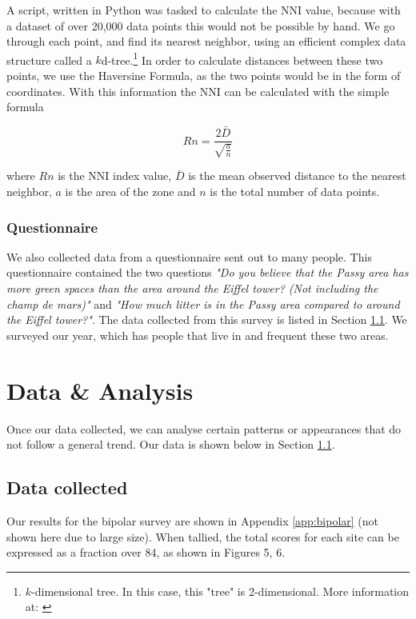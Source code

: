\documentclass[11pt,letterpaper]{article}
\begin{document}
A script, written in Python was tasked to calculate the NNI value, because with a dataset of over 20,000 data points this would not be possible by hand. We go through each point, and find its nearest neighbor, using an efficient complex data structure called a $k$d-tree.\footnote{$k$-dimensional tree. In this case, this "tree" is 2-dimensional. More information at: \cite{bentley_kdtree}}  In order to calculate distances between these two points, we use the Haversine Formula, as the two points would be in the form of coordinates. With this information the NNI can be calculated with the simple formula

$$Rn = \frac{2 \bar D}{\sqrt{\frac{a}{n}}}$$

where $Rn$ is the NNI index value, $\bar D$ is the mean observed distance to the nearest neighbor, $a$ is the area of the zone and $n$ is the total number of data points.

\subsubsection{Questionnaire}
\label{sec:questionnaire}

We also collected data from a questionnaire sent out to many people. This questionnaire contained the two questions \textit{"Do you believe that the Passy area has more green spaces than the area around the Eiffel tower? (Not including the champ de mars)"} and \textit{"How much litter is in the Passy area compared to around the Eiffel tower?"}. The data collected from this survey is listed in Section \ref{sec:data}. We surveyed our year, which has people that live in  and frequent these two areas.


\section{Data \& Analysis}
\label{sec:analysis}

Once our data collected, we can analyse certain patterns or appearances that do not follow a general trend. Our data is shown below in Section \ref{sec:data}.

\subsection{Data collected}
\label{sec:data}

Our results for the bipolar survey are shown in Appendix \ref{app:bipolar} (not shown here due to large size). When tallied, the total scores for each site can be expressed as a fraction over 84, as shown in Figures 5, 6.
\end{document}
